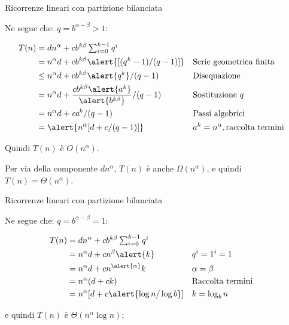 \begin{frame}[shrink=5]{Ricorrenze lineari con partizione bilanciata}
	
	

Ne segue che: $q = b^{\alpha-\beta} > 1$:

\begin{align*}
T(n) &= dn^\alpha  + cb^{k\beta} \textstyle\sum_{i=0}^{k-1} q^i \\
&=n^\alpha d + cb^{k\beta} \alert{[(q^k - 1)/(q - 1)]} && \textrm{Serie geometrica finita} \\
&\le n^\alpha d + cb^{k\beta}\alert{q^k}/(q - 1) && \textrm{Disequazione}\\
&= n^\alpha d + \frac{cb^{k\beta}\alert{a^k}}{\alert{b^{k\beta}}}/(q - 1) && \textrm{Sostituzione $q$}\\
&= n^\alpha d + \textit{ca}^k/(q - 1) && \textrm{Passi algebrici}\\
&= \alert{n^\alpha[d+ c/(q - 1)]} && a^k = n^\alpha, \textrm{raccolta termini}
\end{align*}

\BIL
\item Quindi $T(n)$ è $O(n^\alpha)$. 
\item Per via della componente $dn^\alpha$, $T(n)$ è anche $\Omega(n^\alpha)$,
e quindi $T(n) = \Theta(n^\alpha)$.
\EIL


\end{frame}

\begin{frame}{Ricorrenze lineari con partizione bilanciata}
	

Ne segue che: $q = b^{\alpha-\beta} = 1$:

\begin{align*}
T(n) &= dn^\alpha  + cb^{k\beta} \textstyle\sum_{i=0}^{k-1} q^i \\
&= n^\alpha d + cn^\beta \alert{k} && q^i = 1^i = 1\\
&= n^\alpha d + c n^{\alert{\alpha}} k && \alpha=\beta\\
&= n^\alpha (d + ck) && \textrm{Raccolta termini}\\
&= n^\alpha [d + c\alert{\log n / \log b}] && k = \log_b n
\end{align*}

e quindi $T(n)$ è $\Theta(n^\alpha \log n)$;

\end{frame}

